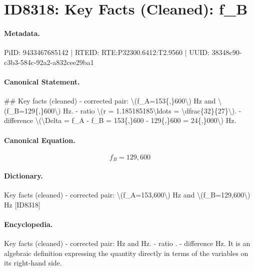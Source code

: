 \section*{ID8318: Key Facts (Cleaned): f\_B}
\paragraph{Metadata.}
PiID: 9433467685142 | RTEID: RTE:P32300.6412:T2.9560 | UUID: 38348c90-c3b3-584c-92a2-a832cee29ba1

\paragraph{Canonical Statement.}
\#\# Key facts (cleaned) - corrected pair: \textbackslash{}(f\_A=153\{,\}600\textbackslash{}) Hz and \textbackslash{}(f\_B=129\{,\}600\textbackslash{}) Hz. - ratio \textbackslash{}(r = 1.185185185\textbackslash{}ldots = \textbackslash{}dfrac\{32\}\{27\}\textbackslash{}). - difference \textbackslash{}(\textbackslash{}Delta = f\_A - f\_B = 153\{,\}600 - 129\{,\}600 = 24\{,\}000\textbackslash{}) Hz.

\paragraph{Canonical Equation.}
\[
f_B=129{,}600
\]

\paragraph{Dictionary.}
Key facts (cleaned) - corrected pair: \textbackslash{}(f\_A=153,600\textbackslash{}) Hz and \textbackslash{}(f\_B=129,600\textbackslash{}) Hz [ID8318]

\paragraph{Encyclopedia.}
Key facts (cleaned) - corrected pair: Hz and Hz. - ratio . - difference Hz. It is an algebraic definition expressing the quantity directly in terms of the variables on its right-hand side.
